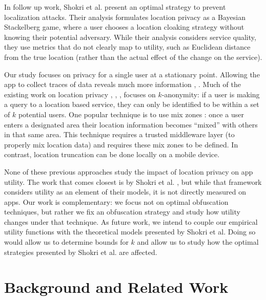 In follow up work, Shokri et al. \cite{Shokri:2012} present an
optimal strategy to prevent localization attacks.
Their analysis formulates location privacy as a Bayesian Stackelberg 
game, where a user chooses a location cloaking strategy without 
knowing their potential adversary.
While their analysis considers service quality, they use metrics that do 
not clearly map to utility, such as Euclidean distance from the 
true location (rather than the actual effect of the change on the service).

Our study focuses on privacy for a single user at a stationary point.
Allowing the app to collect traces of data reveals much more
information \cite{Gruteser:2005}, \cite{Golle:2009}.  Much of the
existing work on location privacy \cite{Beresford:2004}, \cite{Bettini:2005},
\cite{Hoh:2005}, \cite{Gruteser:2003} focuses on $k$-anonymity: if a
user is making a query to a location based service, they can only be
identified to be within a set of $k$ potential users.  
One popular
technique is to use mix zones \cite{Beresford:2004}: once a user enters 
a designated area their location information becomes ``mixed'' with 
others in that same area.  This technique requires a trusted middleware 
layer (to properly mix location data) and requires these mix zones 
to be defined.  In contrast, location truncation can be done locally
on a mobile device.

None of these previous approaches study the impact of location privacy
on app utility.  The work that comes closest is by Shokri et
al. \cite{Shokri:2012}, but while that framework considers utility as
an element of their models, it is not directly measured on apps.  Our
work is complementary: we focus not on optimal obfuscation techniques,
but rather we fix an obfuscation strategy and study how utility
changes under that technique.  As future work, we intend to couple our 
empirical utility functions with the theoretical models presented by
Shokri et al.
Doing so would allow us to determine bounds for $k$ and allow us to study 
how the optimal strategies presented by Shokri et al.
are affected.


\section{Background and Related Work}



